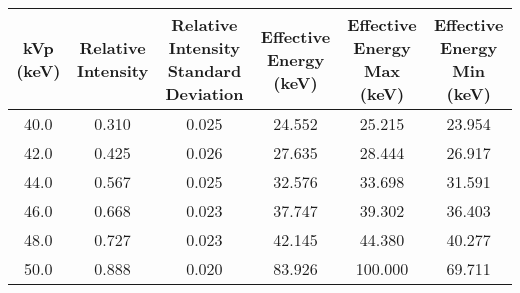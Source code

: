 \begin{tabular}{cccccc}
\toprule
 kVp (keV) &  Relative Intensity &  Relative Intensity Standard Deviation &  Effective Energy (keV) &  Effective Energy Max (keV) &  Effective Energy Min (keV) \\
\midrule
      40.0 &               0.310 &                                  0.025 &                  24.552 &                      25.215 &                      23.954 \\
      42.0 &               0.425 &                                  0.026 &                  27.635 &                      28.444 &                      26.917 \\
      44.0 &               0.567 &                                  0.025 &                  32.576 &                      33.698 &                      31.591 \\
      46.0 &               0.668 &                                  0.023 &                  37.747 &                      39.302 &                      36.403 \\
      48.0 &               0.727 &                                  0.023 &                  42.145 &                      44.380 &                      40.277 \\
      50.0 &               0.888 &                                  0.020 &                  83.926 &                     100.000 &                      69.711 \\
\bottomrule
\end{tabular}

